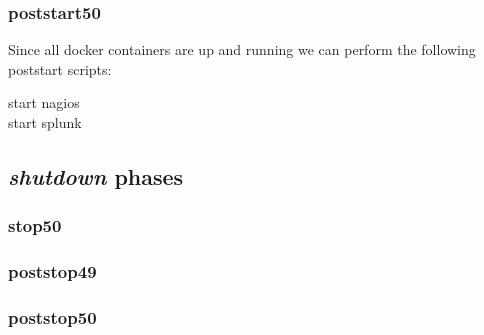 			\subsubsection{poststart50}
			Since all docker containers are up and running we can perform the following poststart scripts:
			\begin{description}
				\item[start nagios] 
				\item[start splunk] 
			\end{description}
		\subsection{\emph{shutdown} phases}
			\subsubsection{stop50}
			\subsubsection{poststop49}
			\subsubsection{poststop50}